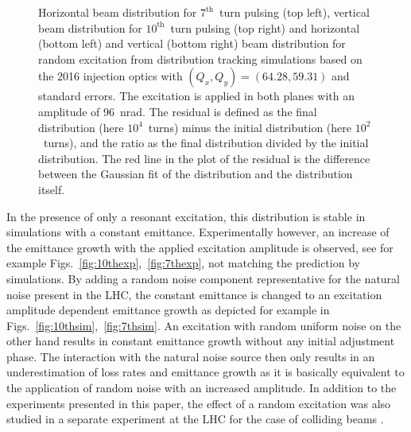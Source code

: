 \documentclass[%
 reprint,
 amsmath,amssymb,
 aps,
prstab,
]{revtex4-1}
\begin{document}
\begin{figure}[t]
\begin{minipage}[t]{0.49\linewidth}
	\end{minipage}	
	\caption{\label{fig:patternhist} Horizontal beam distribution for $7^{\mathrm{th}}$~turn pulsing (top left), vertical beam distribution for $10^{\mathrm{th}}$~turn pulsing (top right) and horizontal (bottom left) and vertical (bottom right) beam distribution for random excitation from distribution tracking simulations based on the 2016 injection optics with $(Q_x,Q_y)=(64.28,59.31)$ and standard errors. The excitation is applied in both planes with an amplitude of 96~nrad. The residual is defined as the final distribution (here $10^4$~turns) minus the initial distribution (here $10^2$~turns), and the ratio as the final distribution divided by the initial distribution. The red line in the plot of the residual is the difference between the Gaussian fit of the distribution and the distribution itself.}
\end{figure}

In the presence of only a resonant excitation, this distribution is stable in simulations with a constant emittance. Experimentally however, an increase of the emittance growth with the applied excitation amplitude is observed, see for example Figs.~\ref{fig:10thexp},~\ref{fig:7thexp}, not matching the prediction by simulations. By adding a random noise component representative for the natural noise present in the LHC, the constant emittance is changed to an excitation amplitude dependent emittance growth as depicted for example in Figs.~\ref{fig:10thsim},~\ref{fig:7thsim}. An excitation with random uniform noise on the other hand results in constant emittance growth without any initial adjustment phase. The interaction with the natural noise source then only results in an underestimation of loss rates and emittance growth as it is basically equivalent to the application of random noise with an increased amplitude. In addition to the experiments presented in this paper, the effect of a random excitation was also studied in a separate experiment at the LHC for the case of colliding beams \cite{md1433_noise_top_energy,md_noise_bbLHC}.
\end{document}
